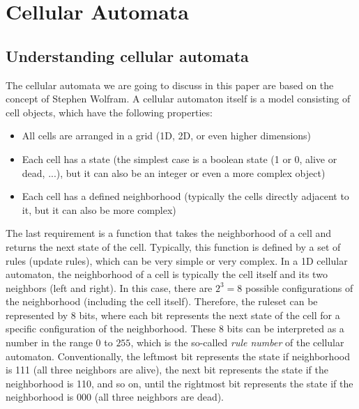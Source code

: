 \documentclass[a4paper,12pt]{llncs}
\numberwithin{equation}{section}
\begin{document}
\section{Cellular Automata}
\subsection{Understanding cellular automata}
\label{sec:cellular-automata-understanding}
The cellular automata we are going to discuss in this paper are based on the concept of Stephen Wolfram.
A cellular automaton itself is a model consisting of cell objects, which have the following properties:
\begin{itemize}
  \item All cells are arranged in a grid (1D, 2D, or even higher dimensions)
  \item Each cell has a state (the simplest case is a boolean state (1 or 0, alive or dead, ...), but it can also be an integer or even a more complex object)
  \item Each cell has a defined neighborhood (typically the cells directly adjacent to it, but it can also be more complex)
\end{itemize}
The last requirement is a function that takes the neighborhood of a cell and returns the next state of the cell.
Typically, this function is defined by a set of rules (update rules), which can be very simple or very complex.
In a 1D cellular automaton, the neighborhood of a cell is typically the cell itself and its two neighbors (left and right).
In this case, there are $2^3=8$ possible configurations of the neighborhood (including the cell itself).
Therefore, the ruleset can be represented by 8 bits, where each bit represents the next state of the cell for a specific configuration of the neighborhood.
These 8 bits can be interpreted as a number in the range $0$ to $255$, which is the so-called \textit{rule number} of the cellular automaton.
Conventionally, the leftmost bit represents the state if neighborhood is 111 (all three neighbors are alive), the next bit represents the state if the neighborhood is 110, and so on, until the rightmost bit represents the state if the neighborhood is 000 (all three neighbors are dead).
\end{document}

